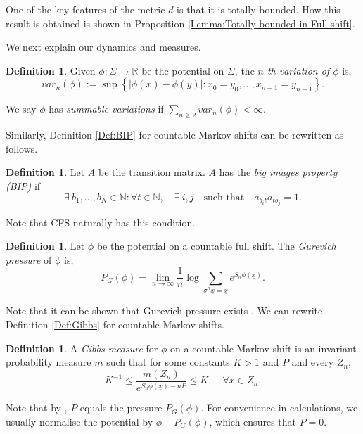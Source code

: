 \documentclass[11pt, reqno]{amsart}
\theoremstyle{plain}%
\theoremstyle{definition}
\newtheorem{definition}[theorem]{Definition}
\theoremstyle{definition}
\def\R{\ensuremath{\mathbb R}}
\def\N{\ensuremath{\mathbb N}}
\def\st{such that }
\numberwithin{equation}{section}
\begin{document}
    One of the key features of the metric $d$ is that it is totally bounded. How this result is obtained is shown in Proposition \ref{Lemma:Totally bounded in Full shift}.



We next explain our dynamics and measures.

\begin{definition}
    Given $\phi:\Sigma \to \R$ be the potential on $\Sigma$, the \textit{$n$-th variation of $\phi$} is,
    $$ var_n(\phi):=\sup \left\{|\phi(x)-\phi(y)|:x_0=y_0,\ldots,x_{n-1}=y_{n-1}\right\}.$$
\end{definition}
We say $\phi$ has \textit{summable variations} if $\sum_{n\ge 2} var_n(\phi)<\infty$.


Similarly, Definition \ref{Def:BIP} for countable Markov shifts can be rewritten as follows.
\begin{definition}\label{Def:BIP_CMS}
    Let $A$ be the transition matrix. $A$ has the \textit{big images property (BIP)} if
    $$ \exists\ b_1,\ldots,b_N \in \N : \forall t\in\N, \quad \exists\ i,j \quad \text{such that}  \quad a_{b_it}a_{tb_j}=1.$$
\end{definition}
Note that CFS naturally has this condition.  

\begin{definition}
    Let $\phi$ be the potential on a countable full shift. The \textit{Gurevich pressure} of $\phi$ is, 
    $$ P_G(\phi)=\lim_{n\to\infty} \frac{1}{n}\log\sum_{\sigma^n \underline{x}=\underline{x}}e^{S_n\phi(\underline{x})} .$$
\end{definition}

Note that it can be shown that Gurevich pressure exists \cite{Sarig1}. We can rewrite Definition \ref{Def:Gibbs} for countable Markov shifts.

\begin{definition}\label{Definition:Gibbs measure in CMS}
A \textit{Gibbs measure} for $\phi$ on a countable Markov shift is an invariant probability measure $m$ such that for some constants $K>1$ and $P$ and every $Z_n$,
$$K^{-1}\le\frac{m(Z_n)}{e^{S_n\phi(\underline{x})-nP}}\le K, \quad \forall \underline{x} \in Z_n.$$
\end{definition}
Note that by \cite[Proposition 2.2]{MauldinUrbanski01}, $P$ equals the pressure $P_G(\phi)$. For convenience in calculations, we usually normalise the potential by $\phi-P_G(\phi)$, which ensures that $P=0$.
\end{document}

